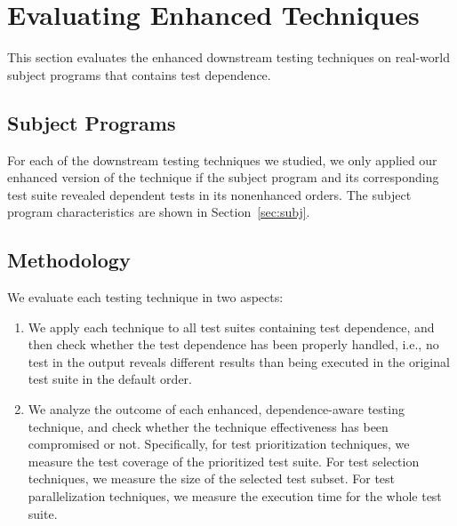 
\section{Evaluating Enhanced Techniques}
\label{sec:evaluation}

This section evaluates the enhanced downstream
testing techniques on real-world subject programs
that contains test dependence.

\subsection{Subject Programs}

For each of the downstream testing techniques we studied,
we only applied our enhanced version of the technique
if the subject program and its corresponding test suite revealed
dependent tests in its nonenhanced orders. 
The subject program characteristics are shown
in Section~\ref{sec:subj}.

\subsection{Methodology}

We evaluate each testing technique in two aspects:
\begin{enumerate}
\item We apply each technique to all test suites containing
test dependence, and then check whether the test dependence
has been properly handled, i.e., no test in the output
reveals different results than being executed in the original
test suite in the default order.
\item We analyze the outcome of each enhanced,
dependence-aware testing technique, and check whether
the technique effectiveness has been compromised or not.
Specifically, for test prioritization techniques, we measure
the test coverage of the prioritized test suite. For test
selection techniques, we measure the size of the selected
test subset. For test parallelization techniques, we measure
the execution time for the whole test suite.

\end{enumerate}


